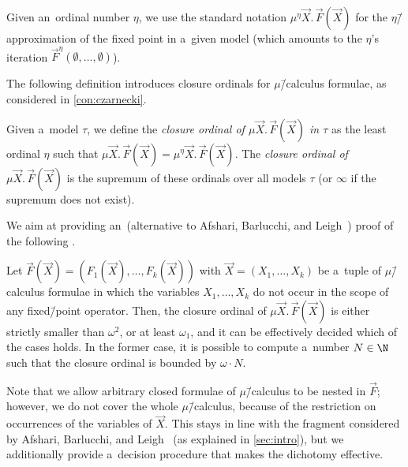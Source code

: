 \documentclass{lmcs}
\numberwithin{equation}{section}
\numberwithin{figure}{section}
\begin{document}
Given an~ordinal number $\eta$, we use the standard notation $\mu^\eta \vec{X}.\,\vec{F}(\vec{X})$ for the $\eta$\=/approximation of the fixed point in a~given model
(which amounts to the $\eta$'s iteration $\vec{F}^{\eta}(\emptyset,\dots,\emptyset)$).

The following definition introduces closure ordinals for $\mu$\=/calculus formulae, as considered in \cref{con:czarnecki}.

\begin{defi}
	Given a~model $\tau$, we define the \emph{closure ordinal of $\mu \vec{X}.\, \vec{F}(\vec{X})$ in $\tau$} as the least ordinal $\eta$ such that $\mu \vec{X}.\,\vec{F}(\vec{X}) = \mu^\eta \vec{X}.\,\vec{F}(\vec{X})$.
	The \emph{closure ordinal of $\mu \vec{X}.\,\vec{F}(\vec{X})$} is the supremum of these ordinals over all models $\tau$ (or $\infty$ if the supremum does not exist).
\end{defi}

We aim at providing an~(alternative to Afshari, Barlucchi, and Leigh~\cite{afshari_limit_fics}) proof of the following .

\begin{thm}\label{thm:closure-mu}
	Let $\vec{F}(\vec{X})=(F_1(\vec{X}),\dots,F_k(\vec{X}))$ with $\vec{X}=(X_1,\dots,X_k)$ be a~tuple of $\mu$\=/calculus formulae in which the variables $X_1,\dots,X_k$ do not occur in the scope of any fixed\=/point operator.
	Then, the closure ordinal of $\mu \vec{X}.\,\vec{F}(\vec{X})$ is either strictly smaller than $\omega^2$, or at least $\omega_1$, and it can be effectively decided which of the cases holds.
	In the former case, it is possible to compute a~number $N\in\N$ such that the closure ordinal is bounded by $\omega\cdot N$.
\end{thm}
\noindent %
Note that we allow arbitrary closed formulae of $\mu$\=/calculus to be nested in $\vec{F}$;
however, we do not cover the whole $\mu$\=/calculus, because of the restriction on occurrences of the variables of $\vec{X}$.
This stays in line with the fragment considered by Afshari, Barlucchi,
and Leigh~\cite{afshari_limit_fics} (as explained in \cref{sec:intro}),
but we additionally provide a~decision procedure that makes the
dichotomy effective.
\end{document}

